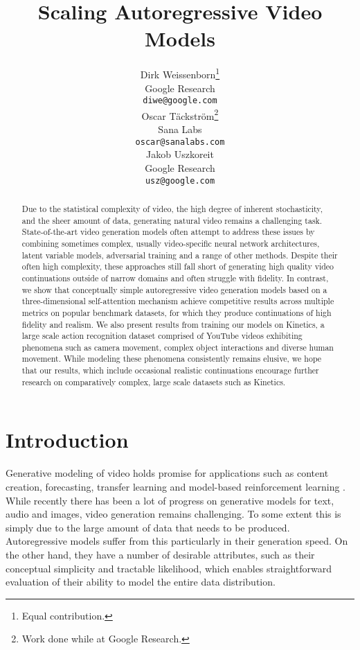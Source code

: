 \documentclass{article} \usepackage{iclr2020_conference,times}
\title{Scaling Autoregressive Video Models}
\author{
   Dirk Weissenborn\thanks{Equal contribution.} \\
   Google Research \\
   \texttt{diwe@google.com} \\
   \And
   Oscar T\"{a}ckstr\"{o}m\thanks{Work done while at Google Research.} \\
   Sana Labs \\
   \texttt{oscar@sanalabs.com} \\
   \And
   Jakob Uszkoreit \\
   Google Research \\
   \texttt{usz@google.com} \\
   }
\begin{document}
\maketitle

\begin{abstract}
Due to the statistical complexity of video, the high degree of inherent stochasticity, and the sheer amount of data, generating natural video remains a challenging task. State-of-the-art video generation models often attempt to address these issues by combining sometimes complex, usually video-specific neural network architectures, latent variable models, adversarial training and a range of other methods. Despite their often high complexity, these approaches still fall short of generating high quality video continuations outside of narrow domains and often struggle with fidelity.
In contrast, we show that conceptually simple autoregressive video generation models based on a three-dimensional self-attention mechanism achieve competitive results across multiple metrics on popular benchmark datasets, for which they produce continuations of high fidelity and realism. 
We also present results from training our models on Kinetics, a large scale action recognition dataset comprised of YouTube videos exhibiting phenomena such as camera movement, complex object interactions and diverse human movement. While modeling these phenomena consistently remains elusive, we hope that our results, which include occasional realistic continuations encourage further research on comparatively complex, large scale datasets such as Kinetics.

\end{abstract}

\section{Introduction}Generative modeling of video holds promise for applications such as content creation, forecasting, transfer learning and model-based reinforcement learning \citep{Srivastava2015MovingMNIST,Vondrick2016Anticipating,Oh2015ActionConditionalVP, Kaiser2019ModelBasedRL}.
While recently there has been a lot of progress on generative models for text, audio and images, video generation remains challenging. To some extent this is simply due to the large amount of data that needs to be produced.
Autoregressive models suffer from this particularly in their generation speed. On the other hand, they have a number of desirable attributes, such as their conceptual simplicity and tractable likelihood, which enables straightforward evaluation of their ability to model the entire data distribution.
\end{document}
